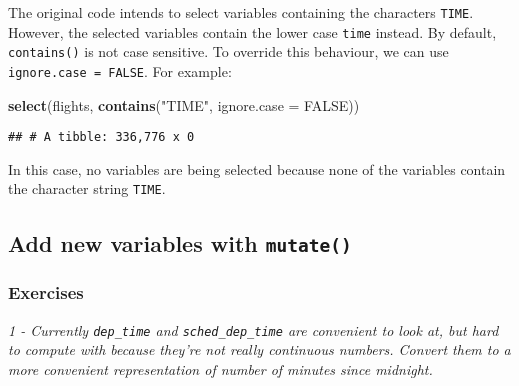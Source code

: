 \documentclass[]{article}
\newenvironment{Shaded}{\begin{snugshade}}{\end{snugshade}}
\newcommand{\KeywordTok}[1]{\textcolor[rgb]{0.13,0.29,0.53}{\textbf{#1}}}
\newcommand{\DataTypeTok}[1]{\textcolor[rgb]{0.13,0.29,0.53}{#1}}
\newcommand{\DecValTok}[1]{\textcolor[rgb]{0.00,0.00,0.81}{#1}}
\newcommand{\StringTok}[1]{\textcolor[rgb]{0.31,0.60,0.02}{#1}}
\newcommand{\OtherTok}[1]{\textcolor[rgb]{0.56,0.35,0.01}{#1}}
\newcommand{\OperatorTok}[1]{\textcolor[rgb]{0.81,0.36,0.00}{\textbf{#1}}}
\newcommand{\NormalTok}[1]{#1}
\theoremstyle{definition}
\theoremstyle{definition}
\theoremstyle{definition}
\theoremstyle{remark}
\begin{document}
The original code intends to select variables containing the characters
\texttt{TIME}. However, the selected variables contain the lower case
\texttt{time} instead. By default, \texttt{contains()} is not case
sensitive. To override this behaviour, we can use
\texttt{ignore.case\ =\ FALSE}. For example:

\begin{Shaded}
\begin{Highlighting}[]
\KeywordTok{select}\NormalTok{(flights, }\KeywordTok{contains}\NormalTok{(}\StringTok{"TIME"}\NormalTok{, }\DataTypeTok{ignore.case =} \OtherTok{FALSE}\NormalTok{))}
\end{Highlighting}
\end{Shaded}

\begin{verbatim}
## # A tibble: 336,776 x 0
\end{verbatim}

In this case, no variables are being selected because none of the
variables contain the character string \texttt{TIME}.

\subsection{\texorpdfstring{Add new variables with
\texttt{mutate()}}{Add new variables with mutate()}}\label{add-new-variables-with-mutate}

\subsubsection{Exercises}\label{exercises-10}

\emph{1 - Currently \texttt{dep\_time} and \texttt{sched\_dep\_time} are
convenient to look at, but hard to compute with because they're not
really continuous numbers. Convert them to a more convenient
representation of number of minutes since midnight.}

\begin{Shaded}
\end{Shaded}
\end{document}
